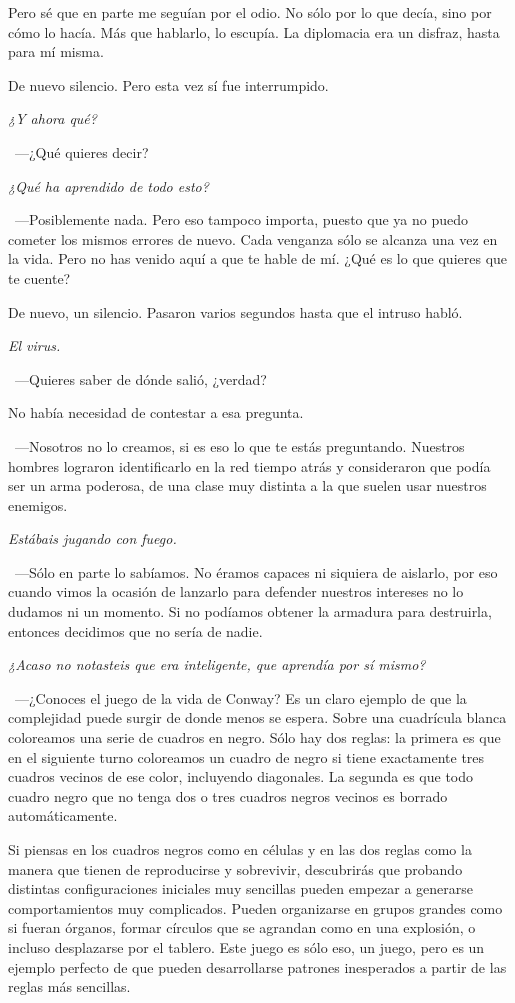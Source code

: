\rquoti Pero sé que en parte me seguían por el odio. No sólo por lo que decía, sino por cómo lo hacía. Más que hablarlo, lo escupía. La diplomacia era un disfraz, hasta para mí misma.

De nuevo silencio. Pero esta vez sí fue interrumpido.

\emph{¿Y ahora qué?}

~---¿Qué quieres decir?

\emph{¿Qué ha aprendido de todo esto?}

~---Posiblemente nada. Pero eso tampoco importa, puesto que ya no puedo cometer los mismos errores de nuevo. Cada venganza sólo se alcanza una vez en la vida. Pero no has venido aquí a que te hable de mí. ¿Qué es lo que quieres que te cuente?

De nuevo, un silencio. Pasaron varios segundos hasta que el intruso habló.

\emph{El virus.}

~---Quieres saber de dónde salió, ¿verdad?

No había necesidad de contestar a esa pregunta.

~---Nosotros no lo creamos, si es eso lo que te estás preguntando. Nuestros hombres lograron identificarlo en la red tiempo atrás y consideraron que podía ser un arma poderosa, de una clase muy distinta a la que suelen usar nuestros enemigos.

\emph{Estábais jugando con fuego.}

~---Sólo en parte lo sabíamos. No éramos capaces ni siquiera de aislarlo, por eso cuando vimos la ocasión de lanzarlo para defender nuestros intereses no lo dudamos ni un momento. Si no podíamos obtener la armadura para destruirla, entonces decidimos que no sería de nadie.

\emph{¿Acaso no notasteis que era inteligente, que aprendía por sí mismo?}

~---¿Conoces el juego de la vida de Conway? Es un claro ejemplo de que la complejidad puede surgir de donde menos se espera. Sobre una cuadrícula blanca coloreamos una serie de cuadros en negro. Sólo hay dos reglas: la primera es que en el siguiente turno coloreamos un cuadro de negro si tiene exactamente tres cuadros vecinos de ese color, incluyendo diagonales. La segunda es que todo cuadro negro que no tenga dos o tres cuadros negros vecinos es borrado automáticamente.

\rquoti Si piensas en los cuadros negros como en células y en las dos reglas como la manera que tienen de reproducirse y sobrevivir, descubrirás que probando distintas configuraciones iniciales muy sencillas pueden empezar a generarse comportamientos muy complicados. Pueden organizarse en grupos grandes como si fueran órganos, formar círculos que se agrandan como en una explosión, o incluso desplazarse por el tablero. Este juego es sólo eso, un juego, pero es un ejemplo perfecto de que pueden desarrollarse patrones inesperados a partir de las reglas más sencillas.

